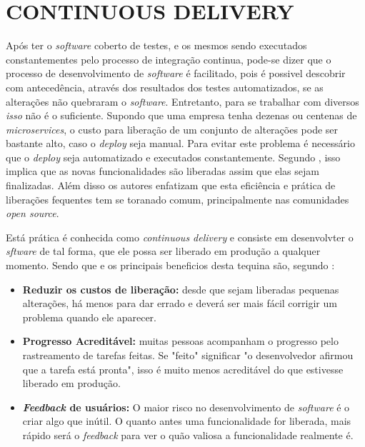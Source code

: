 \section{CONTINUOUS DELIVERY}

Após ter o \textit{software} coberto de testes, e os mesmos sendo executados constantementes pelo processo de integração continua, pode-se dizer que o processo de desenvolvimento de \textit{software} é facilitado, pois é possivel descobrir com antecedência, através dos resultados dos testes automatizados, se as alterações não quebraram o \textit{software}. Entretanto, para se trabalhar com diversos \textit{isso} não é o suficiente. Supondo que uma empresa tenha dezenas ou centenas de \textit{microservices}, o custo para liberação de um conjunto de alterações pode ser bastante alto, caso o \textit{deploy} seja manual. Para evitar este problema é necessário que o \textit{deploy} seja automatizado e executados constantemente. Segundo , isso implica que as novas funcionalidades são liberadas assim que elas sejam finalizadas. Além disso os autores enfatizam que esta eficiência e prática de liberações fequentes tem se toranado comum, principalmente nas comunidades \textit{open source}.

Está prática é conhecida como \textit{continuous delivery} e consiste em desenvolvter o \textit{sftware} de tal forma, que ele possa ser liberado em produção a qualquer momento. Sendo que e os principais beneficios desta tequina são, segundo :

\begin{citacao}
\begin{itemize}
\item \textbf{Reduzir os custos de liberação:} desde que sejam liberadas pequenas alterações, há menos para dar errado e deverá ser mais fácil corrigir um problema quando ele aparecer.
\item \textbf{Progresso Acreditável:} muitas pessoas acompanham o progresso pelo rastreamento de tarefas feitas. Se "feito" significar "o desenvolvedor afirmou que a tarefa está pronta", isso é muito menos acreditável do que estivesse liberado em produção. 
\item \textbf{\textit{Feedback} de usuários:} O maior risco no desenvolvimento de \textit{software} é o criar algo que inútil. O quanto antes uma funcionalidade for liberada, mais rápido será o \textit{feedback} para ver o quão valiosa a funcionalidade realmente é.
\end{itemize}
\end{citacao}